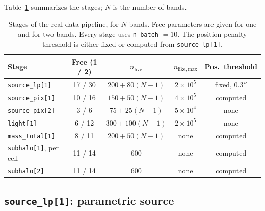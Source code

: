 Table~\ref{tab:pipeline_stages} summarizes the stages; $N$ is the number of bands.

\begin{table}
    \centering
    \footnotesize
    \setlength{\tabcolsep}{4pt}
    \caption{\label{tab:pipeline_stages}Stages of the real-data pipeline, for $N$ bands. Free
    parameters are given for one and for two bands. Every stage uses \texttt{n\_batch} $= 10$. The
    position-penalty threshold is either fixed or computed from \texttt{source\_lp[1]}.}
    \begin{tabular}{lcccc}
        \hline
        Stage & Free (1 / 2) & $n_\mathrm{live}$ & $n_\mathrm{like,max}$ & Pos.\ threshold \\
        \hline
        \texttt{source\_lp[1]}  & 17 / 30 & $200 + 80(N-1)$  & $2 \times 10^5$ & fixed, $0.3''$ \\
        \texttt{source\_pix[1]} & 10 / 16 & $150 + 50(N-1)$  & $4 \times 10^5$ & computed \\
        \texttt{source\_pix[2]} & 3 / 6   & $75 + 25(N-1)$   & $5 \times 10^4$ & none \\
        \texttt{light[1]}       & 6 / 12  & $300 + 100(N-1)$ & $2 \times 10^5$ & none \\
        \texttt{mass\_total[1]} & 8 / 11  & $200 + 50(N-1)$  & none            & computed \\
        \texttt{subhalo[1]}, per cell & 11 / 14 & 600      & none            & computed \\
        \texttt{subhalo[2]}     & 11 / 14 & 600              & none            & computed \\
        \hline
    \end{tabular}
\end{table}

\subsection{\label{sc:pipeline_source_lp}\texttt{source\_lp[1]}: parametric source}


